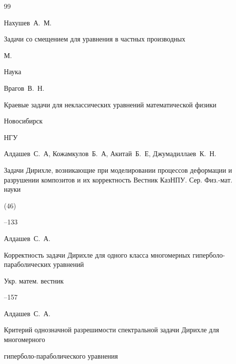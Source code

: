 \begin{thebibliography}{99}




\by  Нахушев~А.~М.

\book Задачи со смещением для уравнения в частных производных

\publaddr М.

\publ Наука







\by  Врагов~В.~Н.

\book Краевые задачи для неклассических уравнений математической физики

\publaddr Новосибирск

\publ НГУ






\by Алдашев~С.~А, Кожамкулов~Б.~А, Акитай~Б.~Е, Джумадиллаев~К.~Н.

\paper  Задачи Дирихле, возникающие при моделировании процессов деформации и разрушении композитов и их корректность \jour Вестник КазНПУ. Сер. Физ.-мат. науки


(46)

--133




\by Алдашев~С.~А.

\paper  Корректность задачи Дирихле для одного класса многомерных гиперболо-параболических уравнений 

\jour Укр. матем. вестник




--157




\by Алдашев~С.~А.

\paper Критерий однозначной разрешимости спектральной задачи Дирихле для многомерного

гиперболо-параболического   уравнения


\end{thebibliography}
